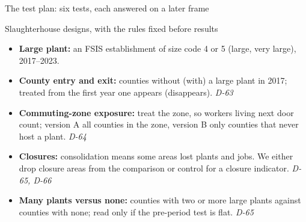 \documentclass[aspectratio=169]{beamer}
\begin{document}
\begin{frame}{The test plan: six tests, each answered on a later frame}
\begin{center}
\end{center}
\end{frame}

\begin{frame}{Slaughterhouse designs, with the rules fixed before results}
\begin{itemize}\footnotesize\setlength\itemsep{4pt}
  \item \textbf{Large plant:} an FSIS establishment of size code 4 or 5 (large, very large), 2017--2023.
  \item \textbf{County entry and exit:} counties without (with) a large plant in 2017; treated from the first year one appears (disappears). \emph{D-63}
  \item \textbf{Commuting-zone exposure:} treat the zone, so workers living next door count; version A all counties in the zone, version B only counties that never host a plant. \emph{D-64}
  \item \textbf{Closures:} consolidation means some areas lost plants and jobs. We either drop closure areas from the comparison or control for a closure indicator. \emph{D-65, D-66}
  \item \textbf{Many plants versus none:} counties with two or more large plants against counties with none; read only if the pre-period test is flat. \emph{D-65}
\end{itemize}
\end{frame}
\end{document}
